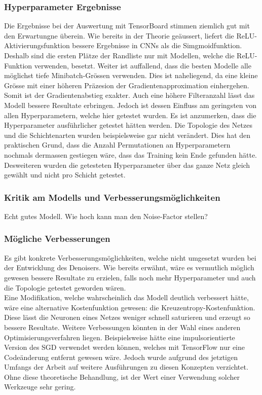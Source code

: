 \subsubsection{Hyperparameter Ergebnisse}
Die Ergebnisse bei der Auswertung mit TensorBoard stimmen ziemlich gut mit den
Erwartungne überein. Wie bereits in der Theorie geäussert, liefert die
ReLU-Aktivierungsfunktion bessere Ergebnisse in CNNs als die Simgmoidfunktion.
Deshalb sind die ersten Plätze der Randliste nur mit Modellen, welche die
ReLU-Funktion verwenden, besetzt. Weiter ist auffallend, dass die besten Modelle
alle möglichst tiefe Minibatch-Grössen verwenden. Dies ist naheliegend, da eine
kleine Grösse mit einer höheren Präzesion der Gradientenapproximation
einhergehen. Somit ist der Gradientenabstieg exakter. Auch eine höhere
Filteranzahl lässt das Modell bessere Resultate erbringen. Jedoch ist dessen
Einfluss am geringsten von allen Hyperparametern, welche hier getestet wurden.
\para{}
Es ist anzumerken, dass die Hyperparameter ausführlicher getestet hätten werden.
Die Topologie des Netzes und die Schichtenarten wurden beispielsweise gar nicht
verändert. Dies hat den praktischen Grund, dass die Anzahl Permutationen an Hyperparametern nochmals dermassen
gestiegen wäre, dass das Training kein Ende gefunden hätte.
Desweiteren wurden die getesteten Hyperparameter über das ganze Netz gleich
gewählt und nicht pro Schicht getestet.

\subsubsection{Kritik am Modells und Verbesserungsmöglichkeiten}
Echt gutes Modell.
Wie hoch kann man den Noise-Factor stellen?

\subsubsection{Mögliche Verbesserungen}
Es gibt konkrete Verbesserungsmöglichkeiten, welche nicht umgesetzt wurden bei
der Entwicklung des Denoisers. Wie bereits erwähnt, wäre es vermutlich möglich
gewesen bessere Resultate zu erzielen, falls noch mehr Hyperparameter und auch
die Topologie getestet geworden wären.
\\
Eine Modifikation, welche wahrscheinlich das Modell deutlich verbessert hätte,
wäre eine alternative Kostenfunktion gewesen: die Kreuzentropy-Kostenfunktion.
Diese lässt die Neuronen eines Netzes weniger schnell saturieren und erzeugt so
bessere Resultate. Weitere Verbessungen könnten in der Wahl eines anderen
Optimisierungsverfahren liegen. Beispielsweise hätte eine impulsorientierte
Version des SGD verwendet werden können, welches mit TensorFlow nur eine
Codeänderung entfernt gewesen wäre. Jedoch wurde aufgrund des jetztigen Umfangs der Arbeit auf
weitere Ausführungen zu diesen Konzepten verzichtet. Ohne diese theoretische
Behandlung, ist der Wert einer Verwendung solcher Werkzeuge sehr gering.
\para{}

